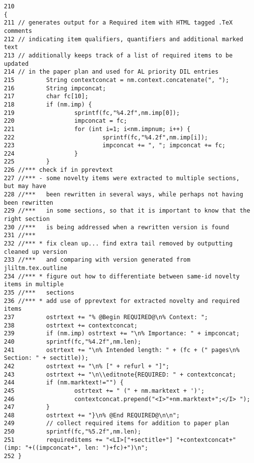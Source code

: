 \footnotesize\begin{verbatim}210                                                                                                                                                           {
211 // generates output for a Required item with HTML tagged .TeX comments
212 // indicating item qualifiers, quantifiers and additional marked text
213 // additionally keeps track of a list of required items to be updated
214 // in the paper plan and used for AL priority DIL entries
215         String contextconcat = nm.context.concatenate(", ");
216         String impconcat;
217         char fc[10];
218         if (nm.imp) {
219                 sprintf(fc,"%4.2f",nm.imp[0]);
220                 impconcat = fc;
221                 for (int i=1; i<nm.impnum; i++) {
222                         sprintf(fc,"%4.2f",nm.imp[i]);
223                         impconcat += ", "; impconcat += fc;
224                 }
225         }
226 //*** check if in pprevtext
227 //*** - some novelty items were extracted to multiple sections, but may have
228 //***   been rewritten in several ways, while perhaps not having been rewritten
229 //***   in some sections, so that it is important to know that the right section
230 //***   is being addressed when a rewritten version is found
231 //***
232 //*** * fix clean up... find extra tail removed by outputting cleaned up version
233 //***   and comparing with version generated from jliltm.tex.outline
234 //*** * figure out how to differentiate between same-id novelty items in multiple
235 //***   sections
236 //*** * add use of pprevtext for extracted novelty and required items
237         ostrtext += "% @Begin REQUIRED@\n% Context: ";
238         ostrtext += contextconcat;
239         if (nm.imp) ostrtext += "\n% Importance: " + impconcat;
240         sprintf(fc,"%4.2f",nm.len);
241         ostrtext += "\n% Intended length: " + (fc + (" pages\n% Section: " + sectitle));
242         ostrtext += "\n% [" + refurl + "]";
243         ostrtext += "\n\\editnote{REQUIRED: " + contextconcat;
244         if (nm.marktext!="") {
245                 ostrtext += " (" + nm.marktext + ')';
246                 contextconcat.prepend("<I>"+nm.marktext+";</I> ");
247         }
248         ostrtext += "}\n% @End REQUIRED@\n\n";
249         // collect required items for addition to paper plan
250         sprintf(fc,"%5.2f",nm.len);
251         requireditems += "<LI>["+sectitle+"] "+contextconcat+" (imp: "+((impconcat+", len: ")+fc)+")\n";
252 }
\end{verbatim}\normalsize 
{}
